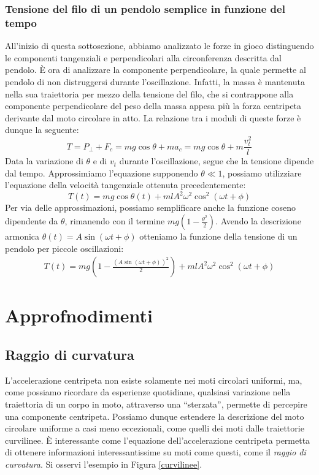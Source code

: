 \subsubsection*{Tensione del filo di un pendolo semplice in funzione del tempo}
All'inizio di questa sottosezione, abbiamo analizzato le forze in gioco
distinguendo le componenti tangenziali e perpendicolari alla circonferenza
descritta dal pendolo. È ora di analizzare la componente perpendicolare,
la quale permette al pendolo di non distruggersi durante l'oscillazione.
Infatti, la massa è mantenuta nella sua traiettoria per mezzo della tensione
del filo, che si contrappone alla componente perpendicolare del peso della
massa appesa più la forza centripeta derivante dal moto circolare in atto.
La relazione tra i moduli di queste forze è dunque la seguente:
\[T = P_\perp + F_c = mg\cos\theta + ma_c = mg\cos\theta + m\frac{v_t^2}{l} \]
Data la variazione di $\theta$ e di $v_t$ durante l'oscillazione, segue
che la tensione dipende dal tempo. Approssimiamo l'equazione supponendo
$\theta\ll1$, possiamo utilizziare
l'equazione della velocità tangenziale ottenuta precedentemente:
\[ T(t) = mg\cos\theta(t) + mlA^2\omega^2\cos^2(\omega t + \phi) \]
Per via delle approssimazioni, possiamo semplificare anche la funzione coseno
dipendente da $\theta$, rimanendo con il termine $mg(1-\frac{\theta^2}{2})$. Avendo la
descrizione armonica $\theta(t) = A\sin(\omega t + \phi)$ otteniamo la funzione
della tensione di un pendolo per piccole oscillazioni:
\begin{align}
    T(t) = mg\left(1 - \frac{(A\sin(\omega t + \phi))^2}{2}\right) + mlA^2\omega^2\cos^2(\omega t + \phi)
\end{align}



\section{Approfnodimenti}

\subsection{Raggio di curvatura}
L'accelerazione centripeta non esiste solamente nei moti circolari uniformi,
ma, come possiamo ricordare da esperienze quotidiane, qualsiasi variazione
nella traiettoria di un corpo in moto, attraverso una ``sterzata'', permette
di percepire una componente centripeta.
Possiamo dunque estendere la descrizione del moto circolare uniforme a casi
meno eccezionali, come quelli dei moti dalle traiettorie curvilinee. È interessante
come l'equazione dell'accelerazione centripeta permetta di ottenere informazioni
interessantissime su moti come questi, come il \textit{raggio di curvatura}. Si
osservi l'esempio in Figura \ref{curvilinee}.

